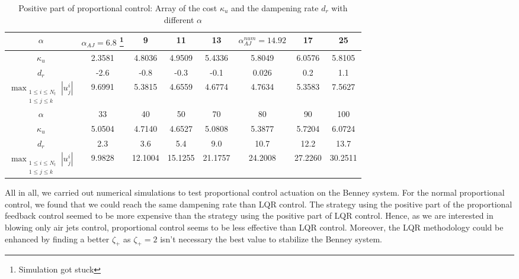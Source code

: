 \documentclass[12pt]{article}
\begin{document}
\begin{table}[ht]
    \caption{Positive part of proportional control: Array of the cost $\kappa_u$ and the dampening 
    rate $d_r$ with different $\alpha$}
    \label{tab:pos_part_propctrl_cost}

    \hspace*{-1cm}
    \begin{tabular}{ |c|c|c|c|c|c|c|c| }
    \hline
    $\alpha$ & $\alpha_{AJ}= 6.8$ \footnote{Simulation got stuck} & 9 & 11 & 13& $\alpha_{AJ}^{num}=14.92$ & 17& 25\\
    \hline
    $\kappa_u$ & 2.3581 & 4.8036 & 4.9509 & 5.4336& 5.8049 & 6.0576 & 5.8105 \\
    $d_r$ & -2.6 & -0.8 & -0.3 & -0.1& 0.026 & 0.2 & 1.1 \\ 
    $\max_{\substack{1\leq i \leq N_t \\ 1\leq j \leq k}}|u_j^i|$  &9.6991&5.3815&4.6559&4.6774&4.7634&5.3583&7.5627\\
    \hline
    $\alpha$ & 33& 40 & 50 & 70 & {\color{red}80} & {\color{red}90} & {\color{red}100}\\
    \hline
    $\kappa_u$ & 5.0504 & 4.7140 & 4.6527 & 5.0808& {\color{red}5.3877} & {\color{red}5.7204}& {\color{red}6.0724} \\ 
    $d_r$ & 2.3 & 3.6 & 5.4 & 9.0 & {\color{red}10.7} & {\color{red}12.2} & {\color{red}13.7}\\
    $\max_{\substack{1\leq i \leq N_t \\ 1\leq j \leq k}}|u_j^i|$ &9.9828&12.1004&15.1255&21.1757&{\color{red}24.2008}&{\color{red}27.2260}&{\color{red}30.2511}\\
    \hline
    \end{tabular}
\end{table}

\vspace{0.5cm}

All in all, we carried out numerical simulations to test proportional control actuation on the Benney system.
For the normal proportional control, we found that we could reach the same dampening rate than LQR control.
The strategy using the positive part of the proportional feedback control seemed to be more expensive
than the strategy using the positive part of  LQR control. Hence, as we are interested in blowing only air jets control, proportional control seems to be less effective than LQR control. Moreover, the LQR methodology could be enhanced by
finding a better $\zeta_+$ as $\zeta_+ = 2$ isn't necessary the best value to stabilize the Benney system. 
\end{document}
